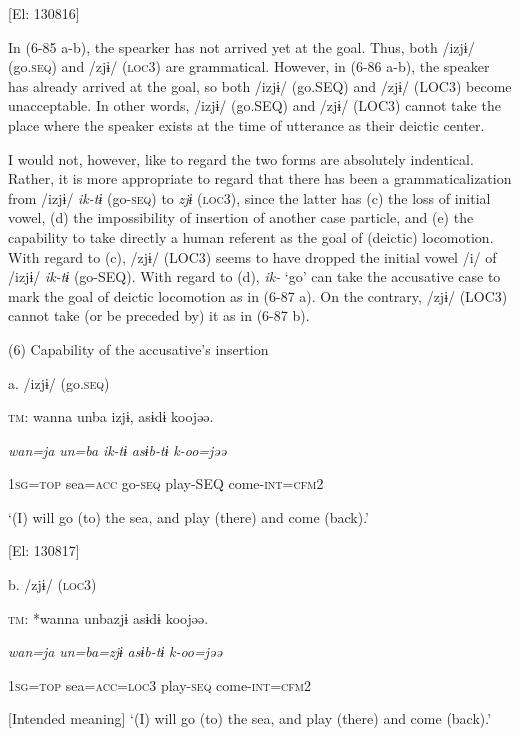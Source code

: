     [El: 130816]

In (6-85 a-b), the spearker has not arrived yet at the goal. Thus, both /izjɨ/ (go.\textsc{seq}) and /zjɨ/ (\textsc{loc}3) are grammatical. However, in (6-86 a-b), the speaker has already arrived at the goal, so both /izjɨ/ (go.SEQ) and /zjɨ/ (LOC3) become unacceptable. In other words, /izjɨ/ (go.SEQ) and /zjɨ/ (LOC3) cannot take the place where the speaker exists at the time of utterance as their deictic center.

  I would not, however, like to regard the two forms are absolutely indentical. Rather, it is more appropriate to regard that there has been a grammaticalization from /izjɨ/ \textit{ik-tɨ} (go-\textsc{seq}) to \textit{zjɨ} (\textsc{loc}3), since the latter has (c) the loss of initial vowel, (d) the impossibility of insertion of another case particle, and (e) the capability to take directly a human referent as the goal of (deictic) locomotion. With regard to (c), /zjɨ/ (LOC3) seems to have dropped the initial vowel /i/ of /izjɨ/ \textit{ik-tɨ} (go-SEQ). With regard to (d), \textit{ik-} ‘go’ can take the accusative case to mark the goal of deictic locomotion as in (6-87 a). On the contrary, /zjɨ/ (LOC3) cannot take (or be preceded by) it as in (6-87 b).

(6)  Capability of the accusative’s insertion

  a.  /izjɨ/ (go.\textsc{seq})

    \textsc{tm}:  wanna  unba  izjɨ,  asɨdɨ  koojəə.

      \textit{wan=ja}  \textit{un=ba}  \textit{ik-tɨ}  \textit{asɨb-tɨ}  \textit{k-oo=jəə}

      1\textsc{sg}=\textsc{top}  sea=\textsc{acc}  go-\textsc{seq}  play-SEQ  come-\textsc{int}=\textsc{cfm}2

      ‘(I) will go (to) the sea, and play (there) and come (back).’

    [El: 130817]

  b.  /zjɨ/ (\textsc{loc}3)

    \textsc{tm}:  *wanna  unbazjɨ  asɨdɨ  koojəə.

      \textit{wan=ja}  \textit{un=ba=zjɨ}  \textit{asɨb-tɨ}  \textit{k-oo=jəə}

      1\textsc{sg}=\textsc{top}  sea=\textsc{acc}=\textsc{loc}3  play-\textsc{seq}  come-\textsc{int}=\textsc{cfm}2

      [Intended meaning] ‘(I) will go (to) the sea, and play (there) and come (back).’

